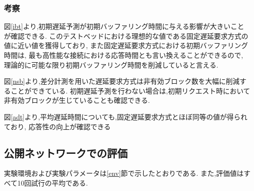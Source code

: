 \documentclass[a4j,12pt]{gradthesis_utf8}
\begin{document}
\clearpage

\subsubsection{考察}
図\ref{ibt}より,初期遅延予測が初期バッファリング時間に与える影響が大きいことが確認できる.
このテストベッドにおける理想的な値である固定遅延要求方式の値に近い値を獲得しており,
また固定遅延要求方式における初期バッファリング時間は,
最も高性能な接続における応答時間とも言い換えることができるので,
理論的に可能な限り初期バッファリング時間を削減していると言える.

図\ref{nsb}より,差分計測を用いた遅延要求方式は非有効ブロック数を大幅に削減することができている.
初期遅延予測を行わない場合は,初期リクエスト時において非有効ブロックが生じていることも確認できる.

図\ref{adt}より,平均遅延時間についても,固定遅延要求方式とほぼ同等の値が得られており,
応答性の向上が確認できる

\clearpage

\subsection{公開ネットワークでの評価}
実験環境および実験パラメータは\ref{env}節で示したとおりである.
また,評価値はすべて10回試行の平均である.
\end{document}

